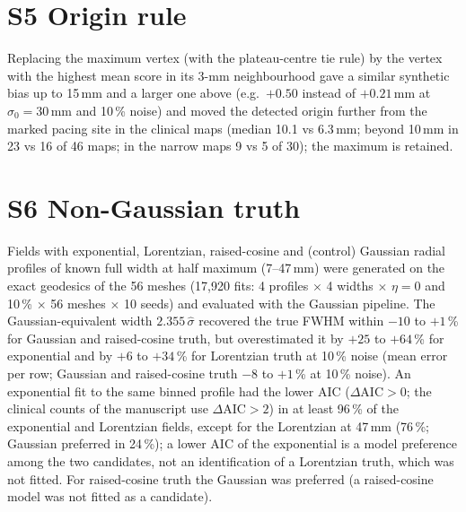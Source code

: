 \documentclass[10pt,a4paper]{article}
\renewcommand{\thetable}{S\arabic{table}}
\newcommand{\stab}[1]{\renewcommand{\thetable}{#1}}
\begin{document}
\section*{S5 Origin rule}
Replacing the maximum vertex (with the plateau-centre tie rule) by the vertex with the highest mean score in its 3-mm neighbourhood gave a similar synthetic bias up to 15\,mm and a larger one above (e.g.\ $+0.50$ instead of $+0.21$\,mm at $\sigma_0 = 30$\,mm and 10\,\% noise) and moved the detected origin further from the marked pacing site in the clinical maps (median 10.1 vs 6.3\,mm; beyond 10\,mm in 23 vs 16 of 46 maps; in the narrow maps 9 vs 5 of 30); the maximum is retained.
\stab{S5}

\section*{S6 Non-Gaussian truth}
Fields with exponential, Lorentzian, raised-cosine and (control) Gaussian radial profiles of known full width at half maximum (7--47\,mm) were generated on the exact geodesics of the 56 meshes (17{,}920 fits: 4 profiles $\times$ 4 widths $\times$ $\eta = 0$ and 10\,\% $\times$ 56 meshes $\times$ 10 seeds) and evaluated with the Gaussian pipeline.  The Gaussian-equivalent width $2.355\,\hat\sigma$ recovered the true FWHM within $-10$ to $+1$\,\% for Gaussian and raised-cosine truth, but overestimated it by $+25$ to $+64$\,\% for exponential and by $+6$ to $+34$\,\% for Lorentzian truth at 10\,\% noise (mean error per row; Gaussian and raised-cosine truth $-8$ to $+1$\,\% at 10\,\% noise).  An exponential fit to the same binned profile had the lower AIC ($\Delta\mathrm{AIC} > 0$; the clinical counts of the manuscript use $\Delta\mathrm{AIC} > 2$) in at least 96\,\% of the exponential and Lorentzian fields, except for the Lorentzian at 47\,mm (76\,\%; Gaussian preferred in 24\,\%); a lower AIC of the exponential is a model preference among the two candidates, not an identification of a Lorentzian truth, which was not fitted.  For raised-cosine truth the Gaussian was preferred (a raised-cosine model was not fitted as a candidate).
\stab{S6}
\end{document}
